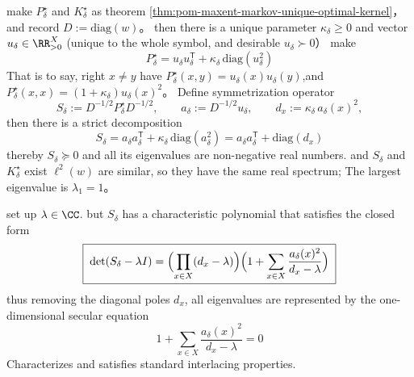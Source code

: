 \begin{theorem}\label{thm:pom-maxent-markov-diagonal-plus-rankone-spectrum}
make \(P^\star_\delta\) and \(K^\star_\delta\) as theorem \ref{thm:pom-maxent-markov-unique-optimal-kernel}，
and record \(D:=\mathrm{diag}(w)\)。
then there is a unique parameter \(\kappa_\delta\ge 0\) and vector \(u_\delta\in\RR_{>0}^{X}\) (unique to the whole symbol, and desirable \(u_\delta\succ0\)）
make
\[
\boxed{\;
P^\star_\delta=u_\delta u_\delta^{\mathsf T}+\kappa_\delta\,\mathrm{diag}(u_\delta^2)\;}
\]
That is to say, right \(x\ne y\) have \(P^\star_\delta(x,y)=u_\delta(x)u_\delta(y)\),and
\(
P^\star_\delta(x,x)=(1+\kappa_\delta)u_\delta(x)^2
\)。
Define symmetrization operator
\[
S_\delta:=D^{-1/2}P^\star_\delta D^{-1/2},
\qquad
a_\delta:=D^{-1/2}u_\delta,
\qquad
d_x:=\kappa_\delta\,a_\delta(x)^2,
\]
then there is a strict decomposition
\[
\boxed{\;
S_\delta=a_\delta a_\delta^{\mathsf T}+\kappa_\delta\,\mathrm{diag}(a_\delta^2)
=a_\delta a_\delta^{\mathsf T}+\mathrm{diag}(d_x)\;}
\]
thereby \(S_\delta\succeq 0\) and all its eigenvalues ​​are non-negative real numbers.
and \(S_\delta\) and \(K^\star_\delta\) exist \(\ell^2(w)\) are similar, so they have the same real spectrum;
The largest eigenvalue is \(\lambda_1=1\)。
\par
set up \(\lambda\in\CC\). but \(S_\delta\) has a characteristic polynomial that satisfies the closed form
\[
\boxed{\;
\det(S_\delta-\lambda I)
=\Bigl(\prod_{x\in X}(d_x-\lambda)\Bigr)\Bigl(1+\sum_{x\in X}\frac{a_\delta(x)^2}{d_x-\lambda}\Bigr)\;}
\]
thus removing the diagonal poles \(d_x\), all eigenvalues ​​are represented by the one-dimensional secular equation
\[
\boxed{\;
1+\sum_{x\in X}\frac{a_\delta(x)^2}{d_x-\lambda}=0\;}
\]
Characterizes and satisfies standard interlacing properties.
\end{theorem}
